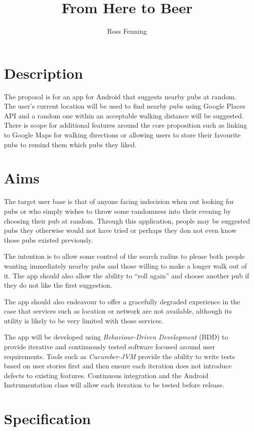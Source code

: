 \documentclass{article}
\title{From Here to Beer\\ \vspace{2 mm}{\large Android Assessment Proposal}}
\author{Ross Fenning}
\begin{document}
\maketitle

\section{Description}

The proposal is for an app for Android that suggests nearby pubs at random.
The user's current location will be used to find nearby pubs using Google
Places API and a random one within an acceptable walking distance will be
suggested. There is scope for additional features around the core proposition
such as linking to Google Maps for walking directions or allowing users
to store their favourite pubs to remind them which pubs they liked.

\section{Aims}

The target user base is that of anyone facing indecision when out looking for
pubs or who simply wishes to throw some randomness into their evening by
choosing their pub at random. Through this application, people may be suggested
pubs they otherwise would not have tried or perhaps they don not even know
those pubs existed previously.

The intention is to allow some control of the search radius to please both
people wanting immediately nearby pubs and those willing to make a longer
walk out of it. The app should also allow the ability to ``roll again'' and
choose another pub if they do not like the first suggestion.

The app should also endeavour to offer a gracefully degraded experience in
the case that services such as location or network are not available,
although its utility is likely to be very limited with those services.

The app will be developed using \emph{Behaviour-Driven Development} (BDD)
to provide
iterative and continuously tested software focused around user requirements.
Tools such as \emph{Cucumber-JVM} provide the ability to write tests based
on user stories first and then ensure each iteration does not introduce
defects to existing features. Continuous integration and the Android
Instrumentation class will allow each iteration to be tested before release.

\section{Specification}
\end{document}
